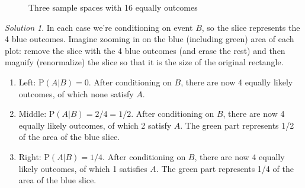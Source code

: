 \documentclass[
  letterpaper,
  DIV=11,
  numbers=noendperiod]{scrreprt}
\providecommand{\tightlist}{%
  \setlength{\itemsep}{0pt}\setlength{\parskip}{0pt}}
\theoremstyle{plain}
\theoremstyle{definition}
\theoremstyle{definition}
\theoremstyle{definition}
\theoremstyle{remark}
\newtheorem{refsolution}{Solution}[chapter]
\begin{document}
\begin{figure}


\caption{\label{fig-venn-conditional-plot}Three sample spaces with 16
equally outcomes}

\end{figure}%

\begin{tcolorbox}[enhanced jigsaw, opacityback=0, rightrule=.15mm, coltitle=black, colframe=quarto-callout-tip-color-frame, toprule=.15mm, colbacktitle=quarto-callout-tip-color!10!white, opacitybacktitle=0.6, left=2mm, toptitle=1mm, breakable, title={Solution (click to expand)}, bottomtitle=1mm, colback=white, leftrule=.75mm, titlerule=0mm, arc=.35mm, bottomrule=.15mm]

\begin{refsolution}
In each case we're conditioning on event \(B\), so the slice represents
the 4 blue outcomes. Imagine zooming in on the blue (including green)
area of each plot: remove the slice with the 4 blue outcomes (and erase
the rest) and then magnify (renormalize) the slice so that it is the
size of the original rectangle.

\begin{enumerate}
\def\labelenumi{\arabic{enumi}.}
\tightlist
\item
  Left: \(\textrm{P}(A|B)=0\). After conditioning on \(B\), there are
  now 4 equally likely outcomes, of which none satisfy \(A\).
\item
  Middle: \(\textrm{P}(A|B) = 2/4=1/2\). After conditioning on \(B\),
  there are now 4 equally likely outcomes, of which 2 satisfy \(A\). The
  green part represents 1/2 of the area of the blue slice.
\item
  Right: \(\textrm{P}(A|B) = 1/4\). After conditioning on \(B\), there
  are now 4 equally likely outcomes, of which 1 satisfies \(A\). The
  green part represents 1/4 of the area of the blue slice.
\end{enumerate}

\label{sol-venn-condition}

\end{refsolution}

\end{tcolorbox}
\end{document}
